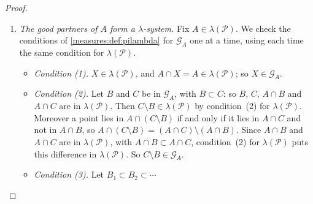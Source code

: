 \begin{notechapter}
\begin{proof}
\begin{enumerate}[nosep]
\begin{itemize}[nosep]
          \item \emph{The way out: freeze $A$.} Fix
                $A\in\lambda(\mathcal P)$. Then
                ``$A\cap B\in\lambda(\mathcal P)$'' is a property of $B$
                alone, $A$ being part of the property, like the number
                $5$ in ``$B$ contains $5$''. Call $B$ a \emph{good
                partner} of $A$ if it has the property, and let
                \[
                  \mathcal G_A = \{B\in\lambda(\mathcal P) :
                  A\cap B\in\lambda(\mathcal P)\}
                \]
                be the family of the good partners of $A$. The pattern
                applies to $\mathcal G_A$: if it is a $\lambda$-system
                containing $\mathcal P$, every member of
                $\lambda(\mathcal P)$ is a good partner of $A$.
        \end{itemize}
        Step~4 shows that $\mathcal G_A$ is a $\lambda$-system, for
        every $A$. That $\mathcal G_A$ contains $\mathcal P$ is shown
        first for the $A$ in $\mathcal P$ (step~5), then for all $A$
        (step~6), as pictured in \cref{measures:fig:passes}.
  \item \emph{The good partners of $A$ form a $\lambda$-system.} Fix
        $A\in\lambda(\mathcal P)$. We check the conditions of
        \cref{measures:def:pilambda} for $\mathcal G_A$ one at a time,
        using each time the same condition for $\lambda(\mathcal P)$.
        \begin{itemize}[nosep]
          \item \emph{Condition (1).} $X\in\lambda(\mathcal P)$, and
                $A\cap X = A\in\lambda(\mathcal P)$; so
                $X\in\mathcal G_A$.
          \item \emph{Condition (2).} Let $B$ and $C$ be in
                $\mathcal G_A$, with $B\subset C$: so $B$, $C$, $A\cap B$
                and $A\cap C$ are in $\lambda(\mathcal P)$. Then
                $C\setminus B\in\lambda(\mathcal P)$ by condition~(2) for
                $\lambda(\mathcal P)$. Moreover a point lies in
                $A\cap(C\setminus B)$ if and only if it lies in $A\cap C$
                and not in $A\cap B$, so
                $A\cap(C\setminus B) = (A\cap C)\setminus(A\cap B)$.
                Since $A\cap B$ and $A\cap C$ are in
                $\lambda(\mathcal P)$, with $A\cap B\subset A\cap C$,
                condition~(2) for $\lambda(\mathcal P)$ puts this
                difference in $\lambda(\mathcal P)$. So
                $C\setminus B\in\mathcal G_A$.
          \item \emph{Condition (3).} Let $B_1\subset B_2\subset\cdots$

\end{itemize}
\end{enumerate}
\end{proof}
\end{notechapter}
